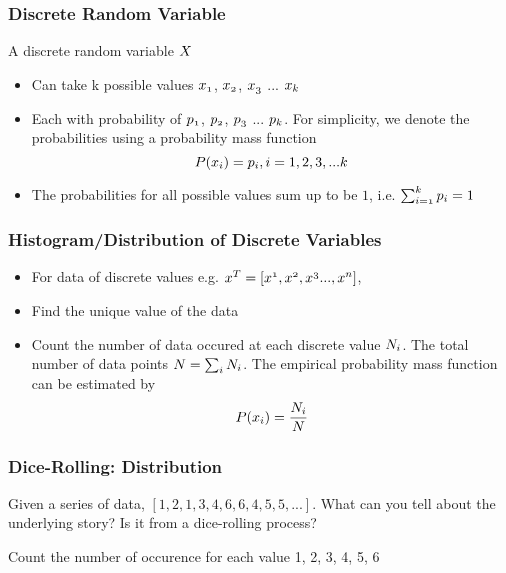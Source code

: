 \documentclass[notheorems, aspectratio=54]{beamer}
\begin{document}
\begin{frame}
\frametitle{Discrete Random Variable}

A discrete random variable $\mathnormal{X}$ 
\begin{itemize}
\item Can take k possible values $\mathnormal{x_{1}}$, $\mathnormal{x_{2}}$, $\mathnormal{x_{3}}$ ... $\mathnormal{x_{k}}$
\item Each with probability of $\mathnormal{p_{1}}$, $\mathnormal{p_{2}}$, $\mathnormal{p_{3}}$ ... $\mathnormal{p_{k}}$. For simplicity, we denote the probabilities using a probability mass function $$\mathnormal{P(x_i)=p_{i}}, \mathnormal{i}=1, 2, 3, ...\mathnormal{k}$$
\item The probabilities for all possible values sum up to be $1$, i.e. $\mathnormal{\sum_{i=1}^{k}p_{i}}=1$
\end{itemize}

\end{frame}


\begin{frame}
\frametitle{Histogram/Distribution of Discrete Variables}
\begin{itemize}
\item For data of discrete values e.g. $\mathnormal{x^T=[x^{1}, x^{2}, x^{3} ..., x^{n}]}$, 
\item Find the unique value of the data
\item Count the number of data occured at each discrete value $\mathnormal{N_i}$. The total number of data points $\mathnormal{N=\sum_{i}N_i}$. The empirical probability mass function can be estimated by $$\mathnormal{P(x_i)=\frac{N_i}{N}}$$

\end{itemize}
\end{frame}


\begin{frame}
\frametitle{Dice-Rolling: Distribution}
Given a series of data, $ [1, 2, 1, 3, 4, 6, 6, 4, 5, 5, ... ]$. What can you tell about the underlying story? Is it from a dice-rolling process? 

\vspace{3mm}

Count the number of occurence for each value 1, 2, 3, 4, 5, 6
\end{frame}
\end{document}
